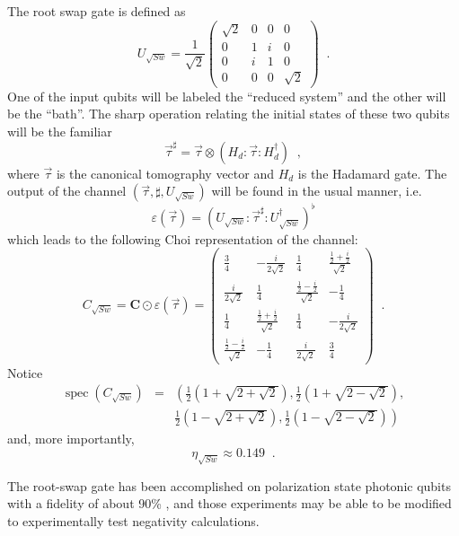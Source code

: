 The root swap gate is defined as
$$
U_{\sqrt{Sw}} = \frac{1}{\sqrt{2}}\begin{pmatrix}
\sqrt{2}&0&0&0\\
0&1&i&0\\
0&i&1&0\\
0&0&0&\sqrt{2}
\end{pmatrix}\;\;.
$$
One of the input qubits will be labeled the ``reduced system'' and the other will be the ``bath''.  The sharp operation relating the initial states of these two qubits will be the familiar 
$$
\vec{\tau}^\sharp = \vec{\tau}\otimes\left(H_d:\vec{\tau}:H_d^\dagger\right)\;\;,
$$
where $\vec{\tau}$ is the canonical tomography vector and $H_d$ is the Hadamard gate.  The output of the channel $(\vec{\tau},\sharp,U_{\sqrt{Sw}})$ will be found in the usual manner, i.e.\
$$
\varepsilon(\vec{\tau}) = \left(U_{\sqrt{Sw}}:\vec{\tau}^\sharp:U_{\sqrt{Sw}}^\dagger\right)^\flat
$$
which leads to the following Choi representation of the channel:
$$
C_{\sqrt{Sw}} = \mathbf{C}\odot\varepsilon\left(\vec{\tau}\right) =
\begin{pmatrix}
 \frac{3}{4} & -\frac{i}{2 \sqrt{2}} & \frac{1}{4} & \frac{\frac{1}{2}+\frac{i}{2}}{\sqrt{2}} \\
 \frac{i}{2 \sqrt{2}} & \frac{1}{4} & \frac{\frac{1}{2}-\frac{i}{2}}{\sqrt{2}} & -\frac{1}{4} \\
 \frac{1}{4} & \frac{\frac{1}{2}+\frac{i}{2}}{\sqrt{2}} & \frac{1}{4} & -\frac{i}{2 \sqrt{2}} \\
 \frac{\frac{1}{2}-\frac{i}{2}}{\sqrt{2}} & -\frac{1}{4} & \frac{i}{2 \sqrt{2}} & \frac{3}{4}
\end{pmatrix}\;\;.
$$
Notice
\begin{eqnarray*}
\operatorname{spec}(C_{\sqrt{Sw}}) &=& \left(\frac{1}{2} \left(1+\sqrt{2+\sqrt{2}}\right),\frac{1}{2} \left(1+\sqrt{2-\sqrt{2}}\right),\right.\\
& &\left. \frac{1}{2} \left(1-\sqrt{2+\sqrt{2}}\right),\frac{1}{2} \left(1-\sqrt{2-\sqrt{2}}\right)\right)
\end{eqnarray*}
and, more importantly,
$$
\eta_{\sqrt{Sw}} \approx 0.149\;\;.
$$

The root-swap gate has been accomplished on polarization state photonic qubits with a fidelity of about 90\% \cite{Cernoch2008}, and those experiments may be able to be modified to experimentally test negativity calculations.  

